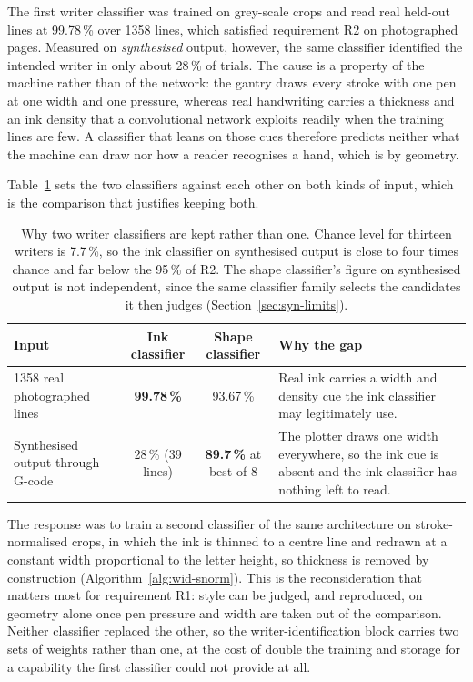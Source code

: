 The first writer classifier was trained on grey-scale crops and read real held-out lines at 99.78\,\% over 1358 lines, which satisfied requirement R2 on photographed pages. Measured on \emph{synthesised} output, however, the same classifier identified the intended writer in only about 28\,\% of trials. The cause is a property of the machine rather than of the network: the gantry draws every stroke with one pen at one width and one pressure, whereas real handwriting carries a thickness and an ink density that a convolutional network exploits readily when the training lines are few. A classifier that leans on those cues therefore predicts neither what the machine can draw nor how a reader recognises a hand, which is by geometry.

Table~\ref{tab:later-twonamers} sets the two classifiers against each other on both kinds of input, which is the comparison that justifies keeping both.

\begin{table}[!htbp]
\centering
\fontsize{8.5}{10.2}\selectfont
\setlength{\tabcolsep}{4pt}
\begin{tabularx}{\linewidth}{|p{3.4cm}|c|c|X|}
\hline
\textbf{Input} & \textbf{Ink classifier} & \textbf{Shape classifier} & \textbf{Why the gap} \\
\hline
1358 real photographed lines & \textbf{99.78\,\%} & 93.67\,\% & Real ink carries a width and density cue the ink classifier may legitimately use. \\
\hline
Synthesised output through G-code & 28\,\% (39 lines) & \textbf{89.7\,\%} at best-of-8 & The plotter draws one width everywhere, so the ink cue is absent and the ink classifier has nothing left to read. \\
\hline
\end{tabularx}
\caption{Why two writer classifiers are kept rather than one. Chance level for thirteen writers is 7.7\,\%, so the ink classifier on synthesised output is close to four times chance and far below the 95\,\% of R2. The shape classifier's figure on synthesised output is not independent, since the same classifier family selects the candidates it then judges (Section~\ref{sec:syn-limits}).}
\label{tab:later-twonamers}
\end{table}

The response was to train a second classifier of the same architecture on stroke-normalised crops, in which the ink is thinned to a centre line and redrawn at a constant width proportional to the letter height, so thickness is removed by construction (Algorithm~\ref{alg:wid-snorm}). This is the reconsideration that matters most for requirement R1: style can be judged, and reproduced, on geometry alone once pen pressure and width are taken out of the comparison. Neither classifier replaced the other, so the writer-identification block carries two sets of weights rather than one, at the cost of double the training and storage for a capability the first classifier could not provide at all.

